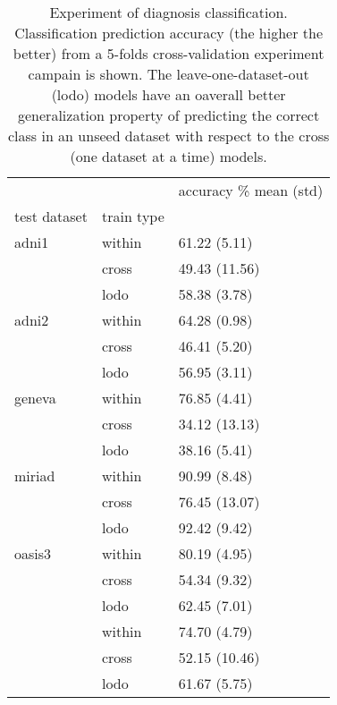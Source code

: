 \begin{table}
\centering
\caption{
Experiment of diagnosis classification.
Classification prediction accuracy (the higher the better) from a 5-folds cross-validation experiment campain is shown.
The leave-one-dataset-out (lodo) models have an oaverall better generalization property of predicting the correct class in an unseed dataset with respect to the cross (\ie one dataset at a time) models.
}
\begin{tabular}{lll}
\toprule
       &      &            accuracy \% mean (std) \\
test dataset & train type &                \\
\midrule
adni1 & within &   61.22 (5.11) \\
       & cross &  49.43 (11.56) \\
       & lodo &   58.38 (3.78) \\
\midrule
adni2 & within &   64.28 (0.98) \\
       & cross &   46.41 (5.20) \\
       & lodo &   56.95 (3.11) \\
\midrule
geneva & within &   76.85 (4.41) \\
       & cross &  34.12 (13.13) \\
       & lodo &   38.16 (5.41) \\
\midrule
miriad & within &   90.99 (8.48) \\
       & cross &  76.45 (13.07) \\
       & lodo &   92.42 (9.42) \\
\midrule
oasis3 & within &   80.19 (4.95) \\
       & cross &   54.34 (9.32) \\
       & lodo &   62.45 (7.01) \\
\midrule
\midrule
       & within &   74.70 (4.79) \\
       & cross  &  52.15 (10.46) \\
       & lodo   &   61.67 (5.75) \\
\bottomrule
\end{tabular}
\end{table}
